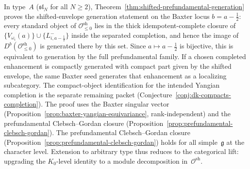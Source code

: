 \begin{remark}
\label{rem:shifted-prefundamental-generation-typeA}
In type~$A$ ($\mathfrak{sl}_N$ for all $N \geq 2$),
Theorem~\ref{thm:shifted-prefundamental-generation} proves the
shifted-envelope generation statement on the Baxter locus
$b = a - \tfrac{1}{2}$: every standard object of
$\mathcal{O}^{\mathrm{sh}}_{\leq 0}$ lies in the thick
idempotent-complete closure of
$\{V_{\omega_i}(a)\} \cup \{L^-_{i,a-\frac{1}{2}}\}$ inside the
separated completion, and hence the image of
$D^b(\mathcal{O}^{\mathrm{sh}}_{\leq 0})$ is generated there by
this set. Since $a \mapsto a - \tfrac{1}{2}$ is bijective, this is
equivalent to generation by the full prefundamental family. If a chosen
completed enhancement is compactly generated with compact part given by
the shifted envelope, the same Baxter seed generates that enhancement
as a localizing subcategory. The compact-object identification for the
intended Yangian completion is the separate remaining packet
\textup{(}Conjecture~\textup{\ref{conj:dk-compacts-completion}}\textup{)}.
The proof uses the Baxter singular vector
(Proposition~\ref{prop:baxter-yangian-equivariance},
rank-independent) and the prefundamental Clebsch--Gordan closure
(Proposition~\ref{prop:prefundamental-clebsch-gordan}).
The prefundamental Clebsch--Gordan closure
(Proposition~\ref{prop:prefundamental-clebsch-gordan}) holds for
all simple~$\mathfrak{g}$ at the character level. Extension to
arbitrary type thus reduces to the categorical lift: upgrading the
$K_0$-level identity to a module decomposition in~$\mathcal{O}^{\mathrm{sh}}$.
\end{remark}


